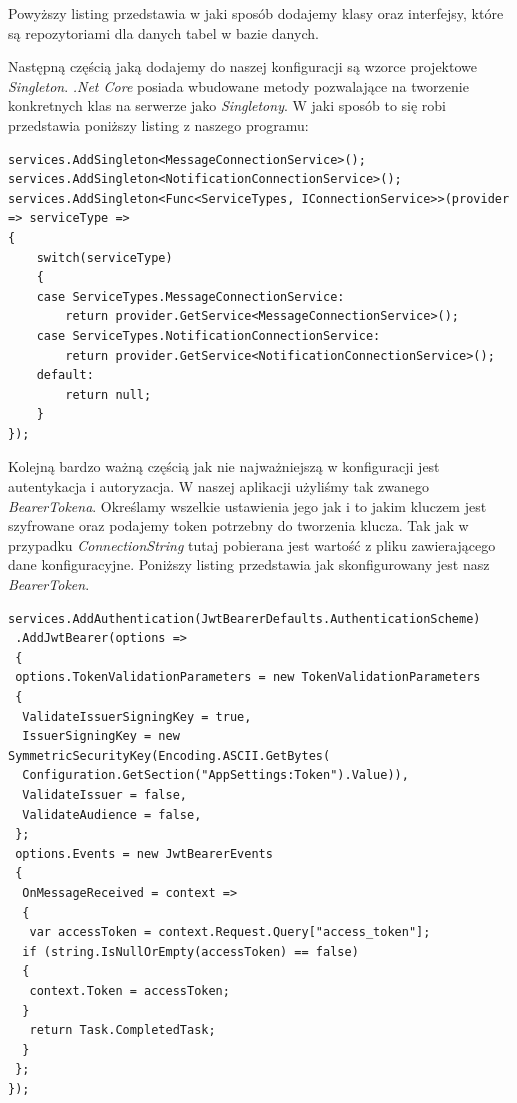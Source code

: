 \documentclass[12pt,a4paper]{article}
\begin{document}
\hspace*{0.7cm} Powyższy listing przedstawia w jaki sposób dodajemy klasy oraz interfejsy, które są repozytoriami dla danych tabel w bazie danych.\newline

\hspace*{0.7cm} Następną częścią jaką dodajemy do naszej konfiguracji są wzorce projektowe \textit{Singleton}. \textit{.Net Core} posiada wbudowane metody pozwalające na tworzenie konkretnych klas na serwerze jako \textit{Singletony}. W jaki sposób to się robi przedstawia poniższy listing z naszego programu:

\begin{lstlisting}[caption={Wzorzec Singleton w konfiguracji}]
services.AddSingleton<MessageConnectionService>();
services.AddSingleton<NotificationConnectionService>();
services.AddSingleton<Func<ServiceTypes, IConnectionService>>(provider => serviceType =>
{
	switch(serviceType)
	{
	case ServiceTypes.MessageConnectionService:
		return provider.GetService<MessageConnectionService>();
	case ServiceTypes.NotificationConnectionService:
		return provider.GetService<NotificationConnectionService>();
	default:
		return null;
	}
});
\end{lstlisting}

\hspace*{0.7cm} Kolejną bardzo ważną częścią jak nie najważniejszą w konfiguracji jest autentykacja i autoryzacja. W naszej aplikacji użyliśmy tak zwanego \textit{BearerTokena}. Określamy wszelkie ustawienia jego jak i to jakim kluczem jest szyfrowane oraz podajemy token potrzebny do tworzenia klucza. Tak jak w przypadku \textit{ConnectionString} tutaj pobierana jest wartość z pliku zawierającego dane konfiguracyjne. Poniższy listing przedstawia jak skonfigurowany jest nasz \textit{BearerToken}.

\begin{lstlisting}[caption={BearerToken - konfiguracja}]
services.AddAuthentication(JwtBearerDefaults.AuthenticationScheme)
 .AddJwtBearer(options =>
 {
 options.TokenValidationParameters = new TokenValidationParameters
 {
  ValidateIssuerSigningKey = true,
  IssuerSigningKey = new  SymmetricSecurityKey(Encoding.ASCII.GetBytes(
  Configuration.GetSection("AppSettings:Token").Value)),
  ValidateIssuer = false,
  ValidateAudience = false,
 };
 options.Events = new JwtBearerEvents
 {
  OnMessageReceived = context =>
  {
   var accessToken = context.Request.Query["access_token"];
  if (string.IsNullOrEmpty(accessToken) == false)
  {
   context.Token = accessToken;
  }
   return Task.CompletedTask;
  }
 };
});
\end{lstlisting}    
\end{document}
